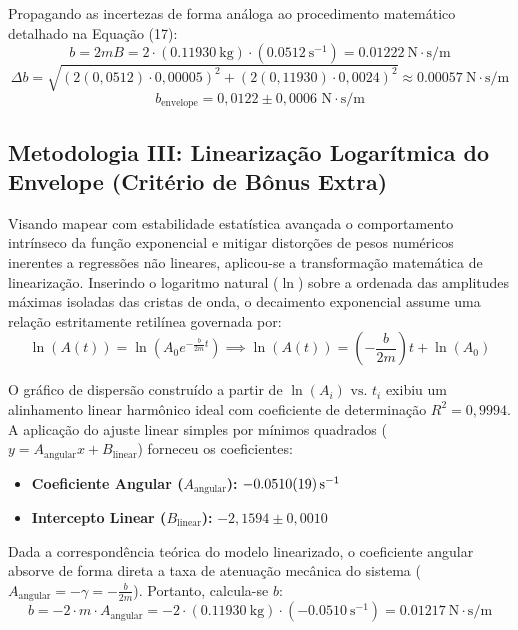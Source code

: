 \documentclass[12pt, a4paper]{article}
\begin{document}
Propagando as incertezas de forma análoga ao procedimento matemático detalhado na Equação (17):
\begin{equation}
    b = 2mB = 2 \cdot (\SI{0,11930}{\kilo\gram}) \cdot (\SI{0,0512}{\second^{-1}}) = \SI{0,01222}{\newton\cdot\second/\meter}
\end{equation}
\begin{equation}
    \Delta b = \sqrt{ \left( 2(0,0512) \cdot 0,00005 \right)^2 + \left( 2(0,11930) \cdot 0,0024 \right)^2 } \approx \SI{0,00057}{\newton\cdot\second/\meter}
\end{equation}
\begin{equation}
    b_{\text{envelope}} = 0,0122 \pm 0,0006 \text{ N}\cdot\text{s/m}
\end{equation}

\subsection{Metodologia III: Linearização Logarítmica do Envelope (Critério de Bônus Extra)}
Visando mapear com estabilidade estatística avançada o comportamento intrínseco da função exponencial e mitigar distorções de pesos numéricos inerentes a regressões não lineares, aplicou-se a transformação matemática de linearização. Inserindo o logaritmo natural ($\ln$) sobre a ordenada das amplitudes máximas isoladas das cristas de onda, o decaimento exponencial assume uma relação estritamente retilínea governada por:
\begin{equation}
    \ln(A(t)) = \ln\left( A_0 e^{-\frac{b}{2m}t} \right) \implies \ln(A(t)) = \left( -\frac{b}{2m} \right)t + \ln(A_0)
\end{equation}

O gráfico de dispersão construído a partir de $\ln(A_i) \text{ vs. } t_i$ exibiu um alinhamento linear harmônico ideal com coeficiente de determinação $R^2 = 0,9994$. A aplicação do ajuste linear simples por mínimos quadrados ($y = A_{\text{angular}}x + B_{\text{linear}}$) forneceu os coeficientes:
\begin{itemize}
    \item \textbf{Coeficiente Angular ($A_{\text{angular}}$):} $\SI{-0,0510 \pm 0,0019}{\second^{-1}}$
    \item \textbf{Intercepto Linear ($B_{\text{linear}}$):} $-2,1594 \pm 0,0010$
\end{itemize}

Dada a correspondência teórica do modelo linearizado, o coeficiente angular absorve de forma direta a taxa de atenuação mecânica do sistema ($A_{\text{angular}} = -\gamma = -\frac{b}{2m}$). Portanto, calcula-se $b$:
\begin{equation}
    b = -2 \cdot m \cdot A_{\text{angular}} = -2 \cdot (\SI{0,11930}{\kilo\gram}) \cdot (\SI{-0,0510}{\second^{-1}}) = \SI{0,01217}{\newton\cdot\second/\meter}
\end{equation}
\end{document}
